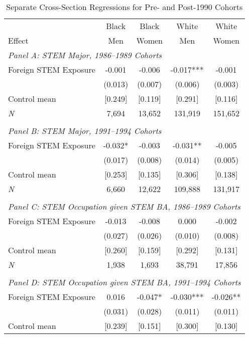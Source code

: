 \begin{table}[ht]
\caption{Separate Cross-Section Regressions for Pre- and Post-1990 Cohorts}
\label{tab:xsLarge}
\centering
\begin{threeparttable}
\begin{tabular}{lcccc}
\toprule 
       & Black           & Black        & White        & White       \\
Effect & Men             & Women        & Men          & Women       \\
\midrule 
\multicolumn{5}{l}{\emph{Panel A: STEM Major, 1986--1989 Cohorts}}\\ 
Foreign STEM Exposure & -0.001  & -0.006  & -0.017*** & -0.001  \\ 
 &  (0.013) & (0.007) & (0.006) & (0.003) \\ 
Control mean &  [0.249] & [0.119] & [0.291] & [0.116] \\ 
\emph{N} &      7,694 &    13,652 &   131,919 &   151,652 \\ 
&&&&\\
\multicolumn{5}{l}{\emph{Panel B: STEM Major, 1991--1994 Cohorts}}\\ 
Foreign STEM Exposure & -0.032* & -0.003  & -0.031** & -0.005  \\ 
 &  (0.017) & (0.008) & (0.014) & (0.005) \\ 
Control mean &  [0.253] & [0.135] & [0.306] & [0.138] \\ 
\emph{N} &      6,660 &    12,622 &   109,888 &   131,917 \\ 
&&&&\\
\multicolumn{5}{l}{\emph{Panel C: STEM Occupation given STEM BA, 1986--1989 Cohorts}}\\ 
Foreign STEM Exposure & -0.013  & -0.008  & 0.000  & -0.002  \\ 
 &  (0.027) & (0.026) & (0.010) & (0.008) \\ 
Control mean &  [0.260] & [0.159] & [0.292] & [0.131] \\ 
\emph{N} &      1,938 &     1,693 &    38,791 &    17,856 \\ 
&&&&\\
\multicolumn{5}{l}{\emph{Panel D: STEM Occupation given STEM BA, 1991--1994 Cohorts}}\\ 
Foreign STEM Exposure & 0.016  & -0.047* & -0.030*** & -0.026** \\ 
 &  (0.031) & (0.028) & (0.011) & (0.011) \\ 
Control mean &  [0.239] & [0.151] & [0.300] & [0.130] \\ 

\end{tabular}
\end{threeparttable}
\end{table}
